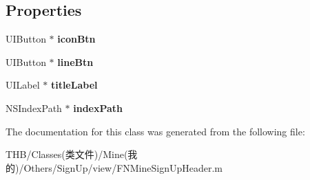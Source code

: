 \subsection*{Properties}
\begin{DoxyCompactItemize}
\item 
\mbox{\label{interface_f_n_mine_sign_up_header_cell_a2d6b7aa44d9a034a6c68fbfa13ffb81e}} 
U\+I\+Button $\ast$ {\bfseries icon\+Btn}
\item 
\mbox{\label{interface_f_n_mine_sign_up_header_cell_a7b992e5c01d4c5f127c5acea921659ef}} 
U\+I\+Button $\ast$ {\bfseries line\+Btn}
\item 
\mbox{\label{interface_f_n_mine_sign_up_header_cell_a52611f52ebae0c43de3d10306796db61}} 
U\+I\+Label $\ast$ {\bfseries title\+Label}
\item 
\mbox{\label{interface_f_n_mine_sign_up_header_cell_aa20d1e4d2011f5a13331215eee069ce9}} 
N\+S\+Index\+Path $\ast$ {\bfseries index\+Path}
\end{DoxyCompactItemize}


The documentation for this class was generated from the following file\+:\begin{DoxyCompactItemize}
\item 
T\+H\+B/\+Classes(类文件)/\+Mine(我的)/\+Others/\+Sign\+Up/view/F\+N\+Mine\+Sign\+Up\+Header.\+m\end{DoxyCompactItemize}

